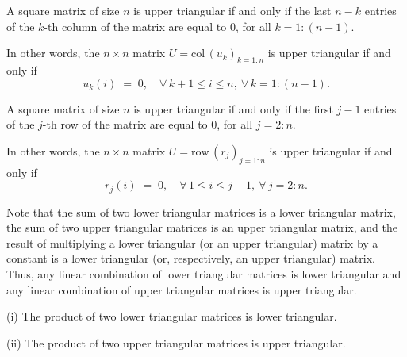 \begin{lemma}
A square matrix of size $n$ is upper triangular if and only if the last
$n-k$ entries of the $k$-th column of the matrix are equal to $0$, for
all $k=1:(n-1)$.

In other words, the $n\times n$ matrix $U=\mathrm{col}\,(u_k)_{k=1:n}$ is
upper triangular if and only if
\begin{equation}
u_k(i) \;=\; 0, \quad \forall\, k+1\le i\le n,\ \forall\, k=1:(n-1).
\end{equation}

A square matrix of size $n$ is upper triangular if and only if the first
$j-1$ entries of the $j$-th row of the matrix are equal to $0$, for all
$j=2:n$.

In other words, the $n\times n$ matrix $U=\mathrm{row}\,(r_j)_{j=1:n}$ is
upper triangular if and only if
\begin{equation}
r_j(i) \;=\; 0, \quad \forall\, 1\le i\le j-1,\ \forall\, j=2:n.
\end{equation}
\end{lemma}

Note that the sum of two lower triangular matrices is a lower triangular
matrix, the sum of two upper triangular matrices is an upper triangular
matrix, and the result of multiplying a lower triangular (or an upper
triangular) matrix by a constant is a lower triangular (or, respectively,
an upper triangular) matrix. Thus, any linear combination of lower
triangular matrices is lower triangular and any linear combination of
upper triangular matrices is upper triangular.

\begin{lemma}
(i) The product of two lower triangular matrices is lower triangular.

(ii) The product of two upper triangular matrices is upper triangular.
\end{lemma}


